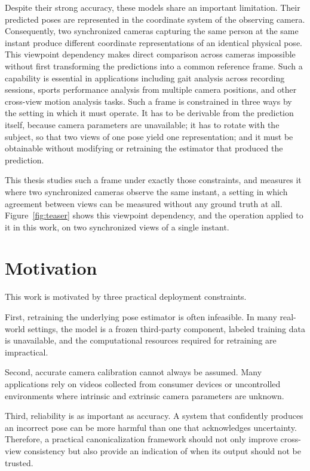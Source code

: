 \documentclass[12pt,a4paper]{report}
\begin{document}
Despite their strong accuracy, these models share an important limitation. Their predicted poses are represented in the coordinate system of the observing camera. Consequently, two synchronized cameras capturing the same person at the same instant produce different coordinate representations of an identical physical pose. This viewpoint dependency makes direct comparison across cameras impossible without first transforming the predictions into a common reference frame. Such a capability is essential in applications including gait analysis across recording sessions, sports performance analysis from multiple camera positions, and other cross-view motion analysis tasks. Such a frame is constrained in three ways by the setting in which it must operate. It has to be derivable from the prediction itself, because camera parameters are unavailable; it has to rotate with the subject, so that two views of one pose yield one representation; and it must be obtainable without modifying or retraining the estimator that produced the prediction.

This thesis studies such a frame under exactly those constraints, and measures it where two synchronized cameras observe the same instant, a setting in which agreement between views can be measured without any ground truth at all. Figure~\ref{fig:teaser} shows this viewpoint dependency, and the operation applied to it in this work, on two synchronized views of a single instant.

\section{Motivation}

This work is motivated by three practical deployment constraints.

First, retraining the underlying pose estimator is often infeasible. In many real-world settings, the model is a frozen third-party component, labeled training data is unavailable, and the computational resources required for retraining are impractical.

Second, accurate camera calibration cannot always be assumed. Many applications rely on videos collected from consumer devices or uncontrolled environments where intrinsic and extrinsic camera parameters are unknown.

Third, reliability is as important as accuracy. A system that confidently produces an incorrect pose can be more harmful than one that acknowledges uncertainty. Therefore, a practical canonicalization framework should not only improve cross-view consistency but also provide an indication of when its output should not be trusted.
\end{document}
